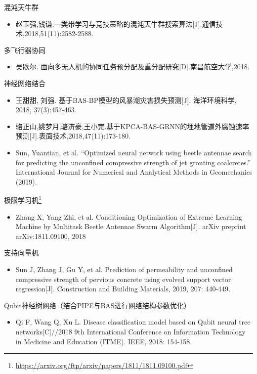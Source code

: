 \documentclass[]{ctexbook}
\providecommand{\tightlist}{%
  \setlength{\itemsep}{0pt}\setlength{\parskip}{0pt}}
\renewcommand{\href}[2]{#2\footnote{\url{#1}}}
\begin{document}
混沌天牛群

\begin{itemize}
\tightlist
\item
  赵玉强,钱谦.一类带学习与竞技策略的混沌天牛群搜索算法{[}J{]}.通信技术,2018,51(11):2582-2588.
\end{itemize}

多飞行器协同

\begin{itemize}
\tightlist
\item
  吴歇尔.
  面向多无人机的协同任务预分配及重分配研究{[}D{]}.南昌航空大学,2018.
\end{itemize}

神经网络结合

\begin{itemize}
\tightlist
\item
  王甜甜, 刘强. 基于BAS-BP模型的风暴潮灾害损失预测{[}J{]}. 海洋环境科学,
  2018, 37(3):457-463.
\item
  骆正山,姚梦月,骆济豪,王小完.基于KPCA-BAS-GRNN的埋地管道外腐蚀速率预测{[}J{]}.表面技术,2018,47(11):173-180.
\item
  Sun, Yuantian, et al. ``Optimized neural network using beetle antennae
  search for predicting the unconfined compressive strength of jet
  grouting coalcretes.'' International Journal for Numerical and
  Analytical Methods in Geomechanics (2019).
\end{itemize}

\href{https://arxiv.org/ftp/arxiv/papers/1811/1811.09100.pdf}{极限学习机}

\begin{itemize}
\tightlist
\item
  Zhang X, Yang Zhi, et al. Conditioning Optimization of Extreme
  Learning Machine by Multitask Beetle Antennae Swarm Algorithm{[}J{]}.
  arXiv preprint arXiv:1811.09100, 2018
\end{itemize}

支持向量机

\begin{itemize}
\tightlist
\item
  Sun J, Zhang J, Gu Y, et al. Prediction of permeability and unconfined
  compressive strength of pervious concrete using evolved support vector
  regression{[}J{]}. Construction and Building Materials, 2019, 207:
  440-449.
\end{itemize}

Qubit神经树网络（结合PIPE与BAS进行网络结构参数优化）

\begin{itemize}
\tightlist
\item
  Qi F, Wang Q, Xu L. Disease classification model based on Qubit neural
  tree networks{[}C{]}//2018 9th International Conference on Information
  Technology in Medicine and Education (ITME). IEEE, 2018: 154-158.
\end{itemize}
\end{document}
